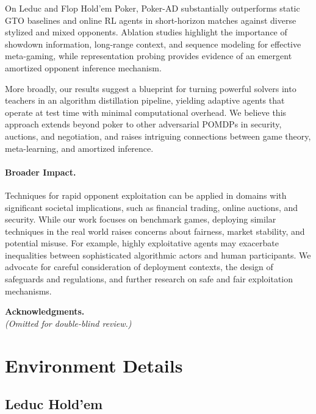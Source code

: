 \documentclass{article}
\begin{document}
On Leduc and Flop Hold'em Poker, Poker-AD substantially outperforms static GTO baselines and online RL agents in short-horizon matches against diverse stylized and mixed opponents. Ablation studies highlight the importance of showdown information, long-range context, and sequence modeling for effective meta-gaming, while representation probing provides evidence of an emergent amortized opponent inference mechanism.

More broadly, our results suggest a blueprint for turning powerful solvers into teachers in an algorithm distillation pipeline, yielding adaptive agents that operate at test time with minimal computational overhead. We believe this approach extends beyond poker to other adversarial POMDPs in security, auctions, and negotiation, and raises intriguing connections between game theory, meta-learning, and amortized inference.

\paragraph{Broader Impact.}
Techniques for rapid opponent exploitation can be applied in domains with significant societal implications, such as financial trading, online auctions, and security. While our work focuses on benchmark games, deploying similar techniques in the real world raises concerns about fairness, market stability, and potential misuse. For example, highly exploitative agents may exacerbate inequalities between sophisticated algorithmic actors and human participants. We advocate for careful consideration of deployment contexts, the design of safeguards and regulations, and further research on safe and fair exploitation mechanisms.

\medskip
\noindent\textbf{Acknowledgments.} \\
\emph{(Omitted for double-blind review.)}




\clearpage
\appendix

\section{Environment Details}
\label{app:envs}

\subsection{Leduc Hold'em}
\end{document}
